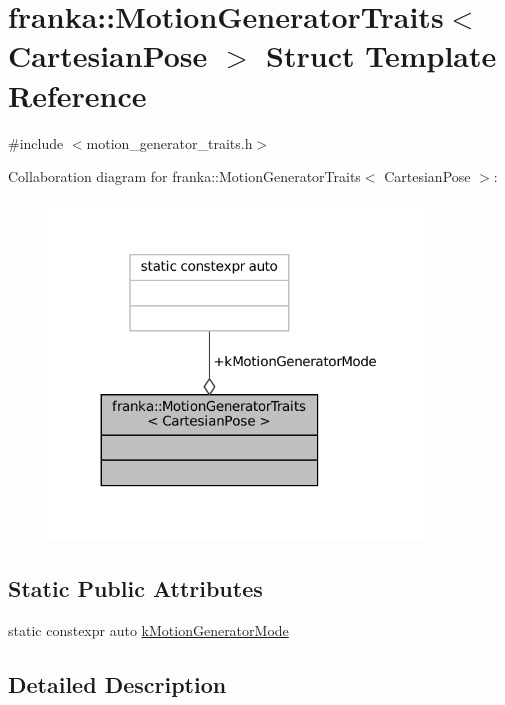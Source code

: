 \hypertarget{structfranka_1_1MotionGeneratorTraits_3_01CartesianPose_01_4}{}\section{franka\+:\+:Motion\+Generator\+Traits$<$ Cartesian\+Pose $>$ Struct Template Reference}
\label{structfranka_1_1MotionGeneratorTraits_3_01CartesianPose_01_4}


{\ttfamily \#include $<$motion\+\_\+generator\+\_\+traits.\+h$>$}



Collaboration diagram for franka\+:\+:Motion\+Generator\+Traits$<$ Cartesian\+Pose $>$\+:
\nopagebreak
\begin{figure}[H]
\begin{center}
\leavevmode
\includegraphics[width=287pt]{structfranka_1_1MotionGeneratorTraits_3_01CartesianPose_01_4__coll__graph}
\end{center}
\end{figure}
\subsection*{Static Public Attributes}
\begin{DoxyCompactItemize}
\item 
static constexpr auto \hyperlink{structfranka_1_1MotionGeneratorTraits_3_01CartesianPose_01_4_ac5a56c6949bc012eac822ce92a03213e}{k\+Motion\+Generator\+Mode}
\end{DoxyCompactItemize}


\subsection{Detailed Description}
